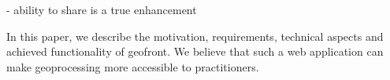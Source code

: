 - ability to share is a true enhancement





In this paper, we describe the motivation, requirements, technical aspects and achieved functionality of geofront. We believe that such a web application can make geoprocessing more accessible to practitioners.












